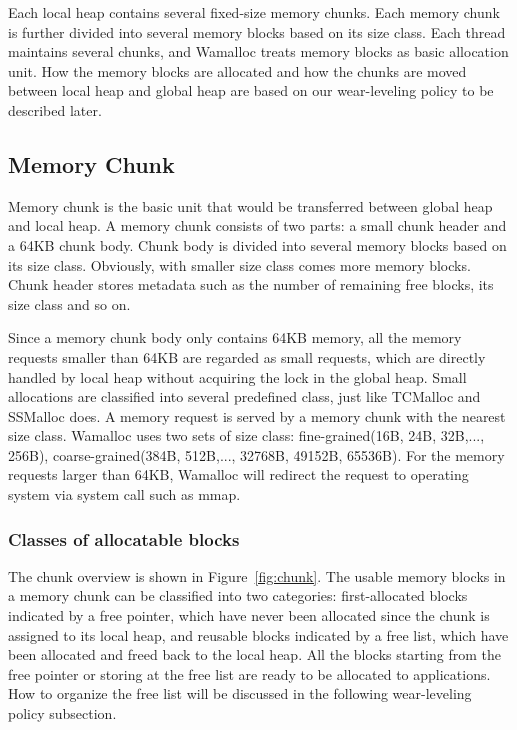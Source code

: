 \documentclass[10pt, conference, compsocconf]{IEEEtran}
\begin{document}
Each local heap contains several fixed-size memory chunks.
Each memory chunk is further divided into several memory blocks based on its size class.
Each thread maintains several chunks, and Wamalloc treats memory blocks as basic allocation unit.
How the memory blocks are allocated and how the chunks are moved between local heap and global heap
are based on our wear-leveling policy to be described later.

\subsection{Memory Chunk}

Memory chunk is the basic unit that would be transferred between global heap and local heap. 
A memory chunk consists of two parts: a small chunk header and a 64KB chunk body. 
Chunk body is divided into several memory blocks based on its size class.
Obviously, with smaller size class comes more memory blocks. 
Chunk header stores metadata such as the number of remaining free blocks, its size class and so on.

Since a memory chunk body only contains 64KB memory, all the memory requests smaller than 64KB are regarded as small requests,
which are directly handled by local heap without acquiring the lock in the global heap.
Small allocations are classified into several predefined class,
just like TCMalloc\cite{ghemawat2009tcmalloc} and SSMalloc\cite{liu2012ssmalloc} does. 
A memory request is served by a memory chunk with the nearest size class. 
Wamalloc uses two sets of size class: fine-grained(16B, 24B, 32B,..., 256B), coarse-grained(384B, 512B,..., 32768B, 49152B, 65536B). 
For the memory requests larger than 64KB, Wamalloc will redirect the request to operating system via system call such as mmap.

\subsubsection{Classes of allocatable blocks}
The chunk overview is shown in Figure~\ref{fig:chunk}.
The usable memory blocks in a memory chunk can be classified into two categories:
first-allocated blocks indicated by a free pointer,
which have never been allocated since the chunk is assigned to its local heap,
and reusable blocks indicated by a free list, which have been allocated and freed back to the local heap.
All the blocks starting from the free pointer or storing at the free list are ready to be allocated to applications. 
How to organize the free list will be discussed in the following wear-leveling policy subsection.
\end{document}
